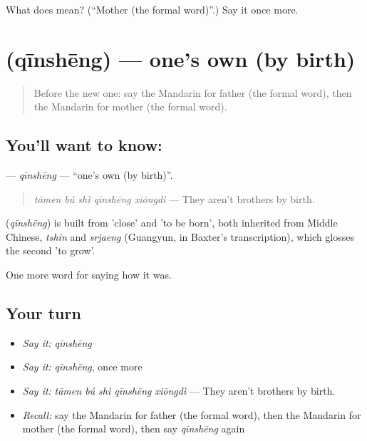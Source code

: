 \begin{tcolorbox}[breakable,colback=teal!4,colframe=teal!35!black,title={Before you move on}]
What does  mean? (\textquotedblleft{}Mother (the formal word)\textquotedblright{}.) Say it once more.
\end{tcolorbox}
\section[\texorpdfstring{\zh{亲生} (qīnshēng)}{亲生 (qīnshēng)}]{ (qīnshēng) — one's own (by birth)}

\label{lesson:ZH-C511-qinsheng}



\begin{quote}
Before the new one: say the Mandarin for father (the formal word), then the Mandarin for mother (the formal word).
\end{quote}

\subsection*{You'll want to know: }
\textbf{} — \emph{qīnshēng} — \textquotedblleft{}one's own (by birth)\textquotedblright{}.

\begin{quote}
\emph{tāmen bú shì qīnshēng xiōngdì} — They aren't brothers by birth.
\end{quote}

\begin{cousinweb}
\textbf{} (\emph{qīnshēng}) is built from  'close' and  'to be born', both inherited from Middle Chinese, \emph{tshin} and \emph{srjaeng} (Guangyun, in Baxter's transcription), which glosses the second 'to grow'.
\end{cousinweb}

\begin{grammarlens}[title={What you've built}]
One more word for saying how it was.
\end{grammarlens}

\subsection*{Your turn}
\begin{itemize}
\raggedright
  \item \emph{Say it:} \emph{qīnshēng}
  \item \emph{Say it:} \emph{qīnshēng}, once more
  \item \emph{Say it:} \emph{tāmen bú shì qīnshēng xiōngdì} — They aren't brothers by birth.
  \item \emph{Recall:} say the Mandarin for father (the formal word), then the Mandarin for mother (the formal word), then say \emph{qīnshēng} again
\end{itemize}

